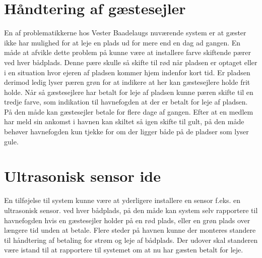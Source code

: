 
\section{Håndtering af gæstesejler}
\label{sub:h_ndtering_af_g_stesejler}
En af problematikkerne hos Vester Baadelaugs nuværende system er at gæster ikke har mulighed for at leje en plads ud for mere end en dag ad gangen. 
En måde at afvikle dette problem på kunne være at installere farve skiftende pærer ved hver bådplads. Denne pære skulle så skifte til rød når pladsen er optaget eller i en situation hvor ejeren af pladsen kommer hjem indenfor kort tid. Er pladsen derimod ledig lyser pæren grøn for at indikere at her kan gæstesejlere holde frit holde. 
Når så gæstesejlere har betalt for leje af pladsen kunne pæren skifte til en tredje farve, som indikation til havnefogden at der er betalt for leje af pladsen. På den måde kan gæstesejler betale for flere dage af gangen. Efter at en medlem har meld sin ankomst i havnen kan skiltet så igen skifte til gult, på den måde behøver havnefogden kun tjekke for om der ligger både på de pladser som lyser gule. 


\section{Ultrasonisk sensor ide} %
\label{sec:Ultrasonisk_ide}

En tilføjelse til system kunne være at yderligere installere en sensor f.eks. en ultrasonisk sensor. ved hver bådplads, på den måde kan system selv rapportere til havnefogden hvis en gæstesejler holder på en rød plads, eller en grøn plads over længere tid unden at betale.
Flere steder på havnen kunne der monteres standere til håndtering af betaling for strøm og leje af bådplads. Der udover skal standeren være istand til at rapportere til systemet om at nu har gæsten betalt for leje.


